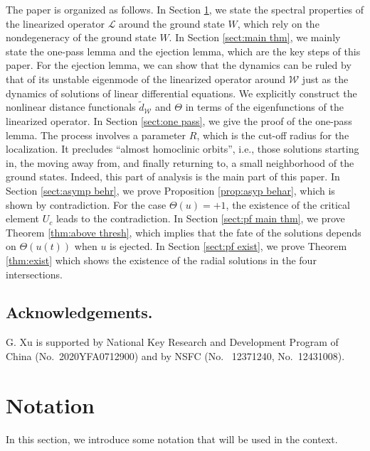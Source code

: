 \documentclass[reqno, 11pt]{amsart}
\numberwithin{equation}{section}
\theoremstyle{plain}
\theoremstyle{definition}
\numberwithin{equation}{section}
\numberwithin{theorem}{section}
\numberwithin{equation}{section}
\numberwithin{equation}{section}
\numberwithin{theorem}{section}
\begin{document}
	The paper is organized as follows. In Section \ref{sect:notation}, we state the spectral properties of the linearized operator $\mathcal{L}$ around the ground state $W$, which rely on the nondegeneracy of the ground state $W$. In Section \ref{sect:main thm}, we mainly state the one-pass lemma and the ejection lemma, which are the key steps of this paper. For the ejection lemma, we can show that the dynamics can be ruled by that of its unstable eigenmode of the linearized operator around $\mathcal{W}$ just as the dynamics of solutions of linear differential equations. We explicitly construct the nonlinear distance functionals $\widetilde{d}_{\mathcal{W}}$ and $\Theta$  in terms of the eigenfunctions of the linearized operator. In Section \ref{sect:one pass}, we give the proof of the one-pass lemma. The process involves a parameter $R$, which is the cut-off radius for the localization. It precludes “almost homoclinic orbits”, i.e., those solutions starting in, the moving away from, and finally returning to, a small neighborhood of the ground states. Indeed, this part of analysis is the main part of this paper. In Section \ref{sect:asymp behr},  we prove Proposition \ref{prop:asyp behar}, which is shown by contradiction. For the case $\Theta(u)=+1$, the existence of the critical element $U_c$ leads to the contradiction. In Section \ref{sect:pf main thm}, we prove Theorem \ref{thm:above thresh}, which implies that the fate of the solutions depends on $\Theta(u(t))$ when $u$ is ejected. In Section \ref{sect:pf exist}, we prove Theorem \ref{thm:exist} which shows the existence of the radial solutions in the four intersections.
	
	\noindent \subsection*{Acknowledgements.}
G. Xu is supported by National Key Research and Development Program of China (No.~2020YFA0712900) and by NSFC (No. ~12371240, No.~12431008).  
	
	
	\section{Notation}\label{sect:notation}
	
	In this section, we introduce some notation that will be used in the context.
	
\end{document}
